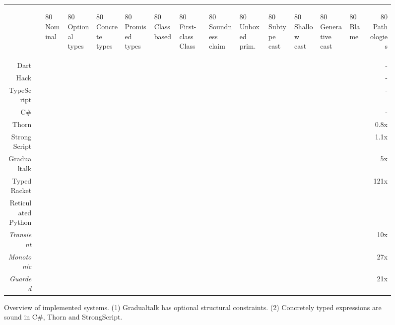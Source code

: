 \documentclass[a4paper,USenglish]{tex/lipics-v2016}
\begin{document}

\newcommand{\rot}[1]{\begin{rotate}{80} #1 \end{rotate}}
\newcommand{\X}{\EM{\bullet}}
\newcommand{\XX}{\EM{\bullet^2}}
\newcommand{\XY}{\EM{\bullet^1}}

\begin{figure}[!ht]
  \center
~ \\[2cm]
  {\small
\begin{tabular}{r|lllllllllllllr}
& & \rot{Nominal}
  & \rot{Optional types}
  & \rot{Concrete types}
  & \rot{Promised types}
  & \rot{Class based}
  & \rot{First-class Class}
  & \rot{Soundness claim}
  & \rot{Unboxed prim.}
  & \rot{Subtype cast}
  & \rot{Shallow cast}
  & \rot{Generative cast}
  & \rot{Blame}
  & \rot{Pathologies}
  \\
Dart         &&\X &\X &   &   &\X &   &    &    &\X &   &   &   &  - 
\\\hline
Hack         &&\X &\X &   &   &\X &   &    &    &\X &   &   &   &  -  
\\\hline
TypeScript   &&   &\X &   &   &\X &   &    &    &   &   &   &   &  -  
\\\hline
C\#          &&\X &\X &\X &   &\X &   &\XX & \X &\X &   &   &   &  -  
\\\hline
Thorn        &&\X &\X &\X &   &\X &   &\XX & \X &\X &   &   &   & 0.8x
\\\hline
StrongScript &&\X &\X &\X &\X &\X &   &\XX &    &\X &   &\X &   & 1.1x   
\\\hline
Gradualtalk  &&\XY&   &   &\X &\X &   & \X &    &   &   &\X &\X &  5x
\\\hline
Typed Racket &&   &   &   &\X &\X &\X &\X  &    &   &\X &\X &\X & 121x 
\\\hline
Reticulated Python    \\
\it Transient&&   &\X &   &   & \X &  & \X &    &   &\X &   &\X & 10x \\
\it Monotonic&&   &   &   &\X & \X &  & \X &    &   &   &\X &\X &  27x\\
\it Guarded  &&   &   &   &\X & \X &  & \X &    &   &   &\X &\X &  21x\\
\end{tabular}}
  \caption{Overview of implemented systems. (1) Gradualtalk has optional
    structural constraints. (2) Concretely typed expressions are sound in
    C\#, Thorn and StrongScript.}\label{over}
\end{figure}
\end{document}
